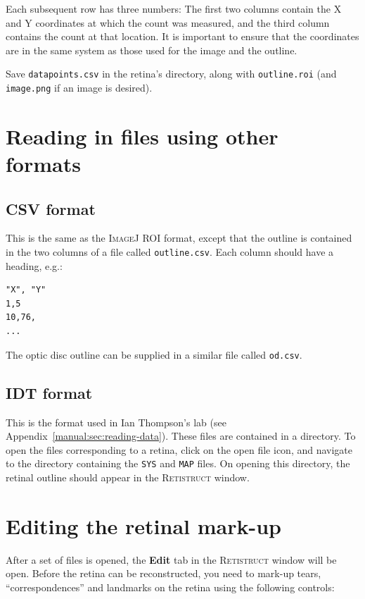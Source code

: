 \documentclass{book}
\begin{document}
Each subsequent row has three numbers: The first two columns contain
the X and Y coordinates at which the count was measured, and the third
column contains the count at that location. It is important to ensure
that the coordinates are in the same system as those used for the
image and the outline.

Save \texttt{datapoints.csv} in the retina's directory, along with
\texttt{outline.roi} (and \texttt{image.png} if an image is desired).

\section{Reading in files using other formats}
\label{retistruct-user-guide:sec:reading-files-using}

\subsection{CSV format}
\label{retistruct-manual:sec:csv-format}

This is the same as the \textsc{ImageJ ROI} format, except that the
outline is contained in the two columns of a file called
\texttt{outline.csv}.  Each column should have a heading, e.g.:
\begin{verbatim}
"X", "Y"
1,5
10,76,
...
\end{verbatim}
The optic disc outline can be supplied in a similar file called
\texttt{od.csv}.

\subsection{IDT format}
\label{retistruct-manual:sec:idt-format}

This is the format used in Ian Thompson's lab (see
Appendix~\ref{manual:sec:reading-data}). These files are contained in
a directory. To open the files corresponding to a retina, click on the
open file icon, and navigate to the directory containing the
\texttt{SYS} and \texttt{MAP} files. On opening this directory, the
retinal outline should appear in the \textsc{Retistruct} window.

\section{Editing the retinal mark-up}
\label{manual:sec:marking-up-retina}

After a set of files is opened, the \textbf{Edit} tab in the
\textsc{Retistruct} window will be open. Before the retina can be
reconstructed, you need to mark-up tears, ``correspondences'' and
landmarks on the retina using the following controls:
\end{document}
